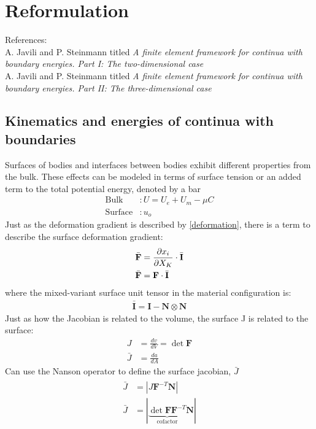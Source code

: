 \documentclass[12pt,3p]{article}
\numberwithin{equation}{section}
\begin{document}
\section{Reformulation}
References: \\
A. Javili and P. Steinmann titled \textit{A finite element framework for continua with boundary energies. Part I: The two-dimensional case} \\
A. Javili and P. Steinmann titled \textit{A finite element framework for continua with boundary energies. Part II: The three-dimensional case} 

\subsection{Kinematics and energies of continua with boundaries}
Surfaces of bodies and interfaces between bodies exhibit different properties from the bulk. These effects can be modeled in terms of surface tension or an added term to the total potential energy, denoted by a bar 
\begin{align*} 
\text{Bulk}&: U = U_e + U_m - \mu C \\
\text{Surface}&: u_o
\end{align*}
Just as the deformation gradient is described by \ref{deformation}, there is a term to describe the surface deformation gradient:
\begin{align}\label{deformationSurface}
\begin{split}
\bar{\mathbf{F}} &= \pdv{x_i}{X_K} \cdot \bar{\mathbf{I}} \\
\bar{\mathbf{F}} &= \mathbf{F} \cdot \bar{\mathbf{I}}
\end{split}
\end{align}
where the mixed-variant surface unit tensor in the material configuration is:
\begin{align}\label{surfaceUnitTensor}
\bar{\mathbf{I}} = \mathbf{I} - \mathbf{N} \otimes \mathbf{N}
\end{align}
Just as how the Jacobian is related to the volume, the surface J is related to the surface: 
\begin{align*}
J &= \frac{dv}{dV} = \det \mathbf{F} \\
\bar{J} &= \frac{da}{dA}
\end{align*}
Can use the Nanson operator to define the surface jacobian, $\bar{J}$
\begin{align}\label{surfaceJacobian}
\begin{split}
\bar{J} &= | J \mathbf{F}^{-T} \mathbf{N} | \\
\bar{J} &= | \underbrace{\det \mathbf{F} \mathbf{F}^{-T}}_\text{cofactor} \mathbf{N} | 
\end{split}	   
\end{align}
\end{document}
